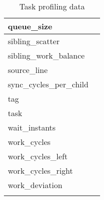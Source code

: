 \documentclass[11pt,a4paper]{article}
\begin{document}
\begin{appendices}
\begin{longtable}{|l|l|}
    queue\_size & \\ \hline
    sibling\_scatter & \\ \hline
    sibling\_work\_balance & \\ \hline
    source\_line & \\ \hline
    sync\_cycles\_per\_child & \\ \hline
    tag & \\ \hline
    task & \\ \hline
    wait\_instants & \\ \hline
    work\_cycles & \\ \hline
    work\_cycles\_left & \\ \hline
    work\_cycles\_right & \\ \hline
    work\_deviation & \\ \hline
    \caption{Task profiling data}
    \label{tab:task-prof-data}
\end{longtable}

\end{appendices}
\end{document}
